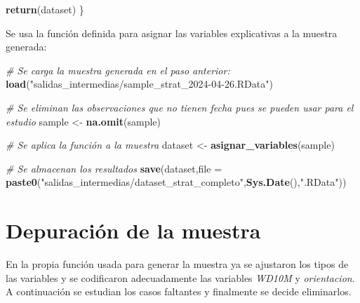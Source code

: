 \documentclass[12pt,a4paper,]{book}
\newenvironment{Shaded}{\begin{snugshade}}{\end{snugshade}}
\newcommand{\AttributeTok}[1]{\textcolor[rgb]{0.13,0.29,0.53}{#1}}
\newcommand{\CommentTok}[1]{\textcolor[rgb]{0.56,0.35,0.01}{\textit{#1}}}
\newcommand{\FunctionTok}[1]{\textcolor[rgb]{0.13,0.29,0.53}{\textbf{#1}}}
\newcommand{\NormalTok}[1]{#1}
\newcommand{\OtherTok}[1]{\textcolor[rgb]{0.56,0.35,0.01}{#1}}
\newcommand{\StringTok}[1]{\textcolor[rgb]{0.31,0.60,0.02}{#1}}
\numberwithin{dummy}{section}
\theoremstyle{ocrenumbox}
\theoremstyle{blacknumex}
\theoremstyle{blacknumbox}
\theoremstyle{ocrenum}
\theoremstyle{ocrenum}
\begin{document}
\begin{Shaded}
\begin{Highlighting}[]
  \FunctionTok{return}\NormalTok{(dataset)}
\NormalTok{\}}
\end{Highlighting}
\end{Shaded}

Se usa la función definida para asignar las variables explicativas a la
muestra generada:

\begin{Shaded}
\begin{Highlighting}[]
\CommentTok{\# Se carga la muestra generada en el paso anterior:}
\FunctionTok{load}\NormalTok{(}\StringTok{"salidas\_intermedias/sample\_strat\_2024{-}04{-}26.RData"}\NormalTok{)}

\CommentTok{\# Se eliminan las observaciones que no tienen fecha pues se pueden usar para el estudio}
\NormalTok{sample }\OtherTok{\textless{}{-}} \FunctionTok{na.omit}\NormalTok{(sample)}

\CommentTok{\# Se aplica la función a la muestra }
\NormalTok{dataset }\OtherTok{\textless{}{-}} \FunctionTok{asignar\_variables}\NormalTok{(sample)}

\CommentTok{\# Se almacenan los resultados}
\FunctionTok{save}\NormalTok{(dataset,}\AttributeTok{file =} \FunctionTok{paste0}\NormalTok{(}\StringTok{"salidas\_intermedias/dataset\_strat\_completo"}\NormalTok{,}\FunctionTok{Sys.Date}\NormalTok{(),}\StringTok{".RData"}\NormalTok{))}
\end{Highlighting}
\end{Shaded}

\hypertarget{depuraciuxf3n-de-la-muestra}{%
\section{Depuración de la muestra}\label{depuraciuxf3n-de-la-muestra}}

En la propia función usada para generar la muestra ya se ajustaron los
tipos de las variables y se codificaron adecuadamente las variables
\emph{WD10M} y \emph{orientacion}. A continuación se estudian los casos
faltantes y finalmente se decide eliminarlos.
\end{document}
